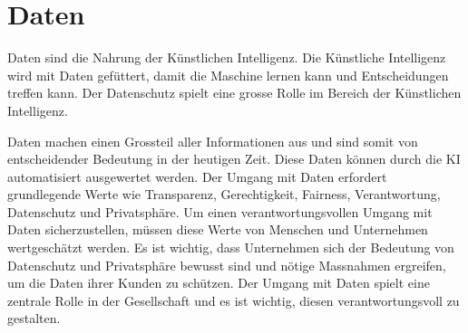 \section{Daten}
\label{sec:data}

Daten sind die Nahrung der Künstlichen Intelligenz. Die Künstliche Intelligenz wird mit Daten
gefüttert, damit die Maschine lernen kann und Entscheidungen treffen kann. Der Datenschutz spielt eine grosse Rolle im Bereich der Künstlichen Intelligenz.

Daten machen einen Grossteil aller Informationen aus und sind somit von entscheidender Bedeutung in der heutigen Zeit. Diese Daten können durch die KI automatisiert ausgewertet werden.
Der Umgang mit Daten erfordert grundlegende Werte wie Transparenz, Gerechtigkeit, Fairness,
Verantwortung, Datenschutz und Privatsphäre. Um einen verantwortungsvollen Umgang mit Daten sicherzustellen, müssen diese Werte von Menschen und Unternehmen wertgeschätzt werden.
Es ist wichtig, dass Unternehmen sich der Bedeutung von Datenschutz und Privatsphäre bewusst
sind und nötige Massnahmen ergreifen, um die Daten ihrer Kunden zu schützen. Der Umgang mit
Daten spielt eine zentrale Rolle in der Gesellschaft und es ist wichtig, diesen verantwortungsvoll
zu gestalten.